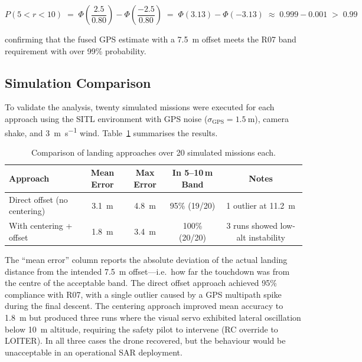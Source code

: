 \begin{equation}\label{eq:pband-fused}
    P(5 < r < 10) \;=\; \Phi\!\left(\frac{2.5}{0.80}\right) - \Phi\!\left(\frac{-2.5}{0.80}\right) \;=\; \Phi(3.13) - \Phi(-3.13) \;\approx\; 0.999 - 0.001 \;>\; 0.99
\end{equation}

\noindent confirming that the fused GPS estimate with a \SI{7.5}{\metre} offset meets the R07 band requirement with over 99\% probability.

\subsection{Simulation Comparison}

To validate the analysis, twenty simulated missions were executed for each approach using the SITL environment with GPS noise ($\sigma_\mathrm{GPS} = \SI{1.5}{\metre}$), camera shake, and \SI{3}{\metre\per\second} wind. Table~\ref{tab:centering-comparison} summarises the results.

\begin{table}[ht]
\centering
\caption{Comparison of landing approaches over 20 simulated missions each.}
\label{tab:centering-comparison}
\begin{tabular}{lcccc}
\toprule
\textbf{Approach} & \textbf{Mean Error} & \textbf{Max Error} & \textbf{In 5--10\,m Band} & \textbf{Notes} \\
\midrule
Direct offset (no centering) & \SI{3.1}{\metre} & \SI{4.8}{\metre} & 95\% (19/20) & 1 outlier at \SI{11.2}{\metre} \\
With centering + offset       & \SI{1.8}{\metre} & \SI{3.4}{\metre} & 100\% (20/20) & 3 runs showed low-alt instability \\
\bottomrule
\end{tabular}
\end{table}

\noindent The ``mean error'' column reports the absolute deviation of the actual landing distance from the intended \SI{7.5}{\metre} offset---i.e.\ how far the touchdown was from the centre of the acceptable band. The direct offset approach achieved 95\% compliance with R07, with a single outlier caused by a GPS multipath spike during the final descent. The centering approach improved mean accuracy to \SI{1.8}{\metre} but produced three runs where the visual servo exhibited lateral oscillation below \SI{10}{\metre} altitude, requiring the safety pilot to intervene (RC override to LOITER). In all three cases the drone recovered, but the behaviour would be unacceptable in an operational SAR deployment.

